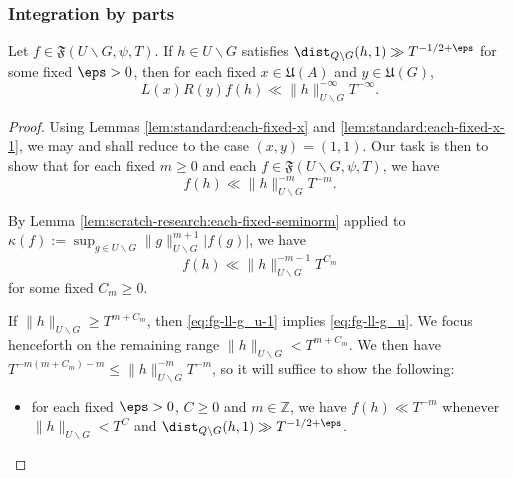 \subsubsection{Integration by parts}\label{sec:integration-parts}


\begin{lemma}\label{lem:scratch-research:let-h-in}
  Let $f \in \mathfrak{F}(U \backslash G, \psi, T)$.  If $h \in U \backslash G$ satisfies $\dist_{Q \backslash G}(h,1) \gg T^{-1/2+\eps}$ for some fixed $\eps > 0$, then for each fixed $x \in \mathfrak{U}(A)$ and $y \in \mathfrak{U}(G)$,
  \begin{equation*}
    L(x) R(y) f(h) \ll
    \|h\|_{U \backslash G}^{-\infty}
    T^{-\infty}.
  \end{equation*}
\end{lemma}
\begin{proof}
  Using Lemmas \ref{lem:standard:each-fixed-x} and \ref{lem:standard:each-fixed-x-1}, we may and shall reduce to the case $(x,y) = (1,1)$.  Our task is then to show that for each fixed $m \geq 0$ and each $f \in \mathfrak{F}(U \backslash G, \psi, T)$, we have
  \begin{equation}\label{eq:fg-ll-g_u}
    f(h) \ll \|h\|_{U \backslash G}^{-m} T^{-m}.
  \end{equation}

  By Lemma \ref{lem:scratch-research:each-fixed-seminorm} applied to $\kappa(f) := \sup_{g \in U \backslash G} \|g\|_{U \backslash G}^{m+1} |f(g)|$, we have
  \begin{equation}\label{eq:fg-ll-g_u-1}
    f(h) \ll \|h\|_{U \backslash G}^{-m - 1} T^{C_m}
  \end{equation}
  for some fixed $C_m \geq 0$.

  If $\|h\|_{U \backslash G} \geq T^{m + C_m}$, then \eqref{eq:fg-ll-g_u-1} implies \eqref{eq:fg-ll-g_u}.  We focus henceforth on the remaining range $\|h\|_{U \backslash G} < T^{m + C_m}$.  We then have $T^{-m(m+ C_m) - m} \leq \|h\|_{U \backslash G}^{-m} T^{-m}$, so it will suffice to show the following:
  \begin{itemize}
  \item for each fixed $\eps > 0$, $C \geq 0$ and $m \in \mathbb{Z}$, we have $f(h) \ll T^{-m}$ whenever $\|h\|_{U \backslash G} < T^{C}$ and $\dist_{Q \backslash G}(h,1) \gg T^{-1/2+\eps}$.
  \end{itemize}


\end{proof}
